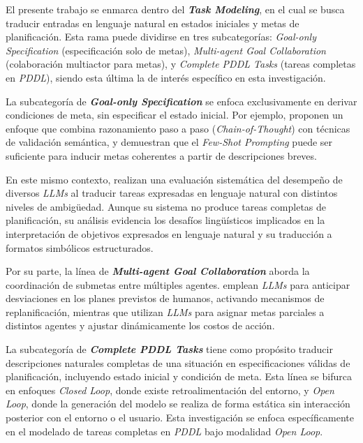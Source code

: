 El presente trabajo se enmarca dentro del \textbf{\textit{Task Modeling}}, en el cual se busca traducir entradas en lenguaje natural en estados iniciales y metas de planificación. Esta rama puede dividirse en tres subcategorías: \textit{Goal-only Specification} (especificación solo de metas), \textit{Multi-agent Goal Collaboration} (colaboración multiactor para metas), y \textit{Complete PDDL Tasks} (tareas completas en \textit{PDDL}), siendo esta última la de interés específico en esta investigación.

La subcategoría de \textbf{\textit{Goal-only Specification}} se enfoca exclusivamente en derivar condiciones de meta, sin especificar el estado inicial. Por ejemplo, \textcite{lyu2023faithful} proponen un enfoque que combina razonamiento paso a paso (\textit{Chain-of-Thought}) con técnicas de validación semántica, y \textcite{collins2022structured} demuestran que el \textit{Few-Shot Prompting} puede ser suficiente para inducir metas coherentes a partir de descripciones breves.

En este mismo contexto, \textcite{xie2023translating} realizan una evaluación sistemática del desempeño de diversos \textit{LLMs} al traducir tareas expresadas en lenguaje natural con distintos niveles de ambigüedad. Aunque su sistema no produce tareas completas de planificación, su análisis evidencia los desafíos lingüísticos implicados en la interpretación de objetivos expresados en lenguaje natural y su traducción a formatos simbólicos estructurados.

Por su parte, la línea de \textbf{\textit{Multi-agent Goal Collaboration}} aborda la coordinación de submetas entre múltiples agentes. \textcite{singh2024anticipate} emplean \textit{LLMs} para anticipar desviaciones en los planes previstos de humanos, activando mecanismos de replanificación, mientras que \textcite{izquierdo2024plancollabnl} utilizan \textit{LLMs} para asignar metas parciales a distintos agentes y ajustar dinámicamente los costos de acción.

La subcategoría de \textbf{\textit{Complete PDDL Tasks}} tiene como propósito traducir descripciones naturales completas de una situación en especificaciones válidas de planificación, incluyendo estado inicial y condición de meta. Esta línea se bifurca en enfoques \textit{Closed Loop}, donde existe retroalimentación del entorno, y \textit{Open Loop}, donde la generación del modelo se realiza de forma estática sin interacción posterior con el entorno o el usuario. Esta investigación se enfoca específicamente en el modelado de tareas completas en \textit{PDDL} bajo modalidad \textit{Open Loop}.

